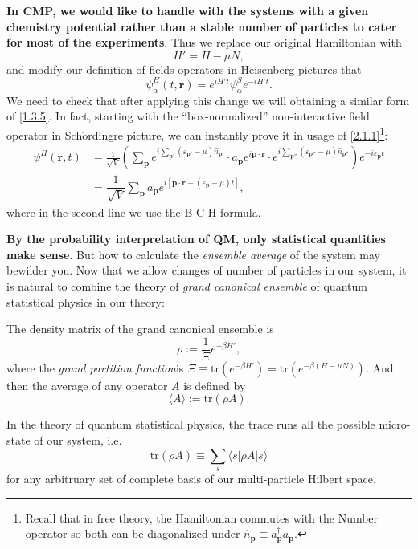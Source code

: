 \documentclass[b5paper,10pt,UTF8]{book}
\numberwithin{equation}{section}
\begin{document}
		\textbf{In CMP, we would like to handle with the systems with a given chemistry potential rather than a stable number of particles to cater for most of the experiments}. Thus we replace our original Hamiltonian with
		$$H'=H-\mu N,$$
		and modify our definition of fields operators in Heisenberg pictures that
		\begin{equation}\label{2.1.1}
			\psi^H_\alpha(t,\bm{r})=e^{iH't}\psi_\alpha^S e^{-iH't}.
		\end{equation}
		We need to check that after applying this change we will obtaining a similar form of \eqref{1.3.5}. In fact,
		starting with the ``box-normalized'' non-interactive field operator in Sch$\ddot{\text{o}}$rdingre picture, we can instantly prove it in usage of \eqref{2.1.1}\footnote{Recall that in free theory, the Hamiltonian commutes with the Number operator so both can be diagonalized under $\hat{n}_{\bm{p}}\equiv a_{\bm{p}}^\dagger a_{\bm{p}}$.}:
			\begin{align}
				\psi^H(\bm{r},t)&=\frac{1}{\sqrt{V}} \left(\sum_{\bm p}e^{i\sum_{\bm{p'}}(\varepsilon_{\bm{p'}}-\mu)\hat{n}_{\bm{p'}}}\cdot a_{\bm{p}}e^{i\bm{p\cdot r}}\cdot e^{i\sum_{\bm{p''}}(\varepsilon_{\bm{p''}}-\mu)\hat{n}_{\bm{p''}}}\right)e^{-i\varepsilon_{\bm{p}}t}\nonumber\\
				&=\dfrac{1}{\sqrt{V}}\sum_{\bm{p}}a_{\bm{p}}e^{i[\bm{p\cdot r}-(\varepsilon_{\bm{p}}-\mu)t]},\label{5.3.6}
			\end{align}
			where in the second line we use the B-C-H formula.\par
		\textbf{By the probability interpretation of QM, only statistical quantities make sense}. But how to calculate the \emph{ensemble average} of the system may bewilder you. Now that we allow changes of number of particles in our system, it is natural to combine the theory of \emph{grand canonical ensemble} of quantum statistical physics in our theory:
		\begin{Def}
			The density matrix of the grand canonical ensemble is
			\begin{equation}\label{2.1.2}
				\rho:=\dfrac{1}{\varXi}e^{-\beta H'},
			\end{equation}
			where the \emph{grand partition function}is $\varXi\equiv\mathrm{tr}(e^{-\beta H'})=\mathrm{tr}(e^{-\beta(H-\mu N)})$. And then the average of any operator $A$ is defined by
			$$\langle A\rangle:=\mathrm{tr}(\rho A).$$
		\end{Def}
		\begin{Note}
			In the theory of quantum statistical physics, the trace runs all the possible micro-state of our system, i.e.
			\begin{equation}\label{2.1.3}
				\mathrm{tr}(\rho A)\equiv\sum_{s}\langle s|\rho A|s\rangle
			\end{equation}
			for any arbitruary set of complete basis of our multi-particle Hilbert space.
		\end{Note}
\end{document}
